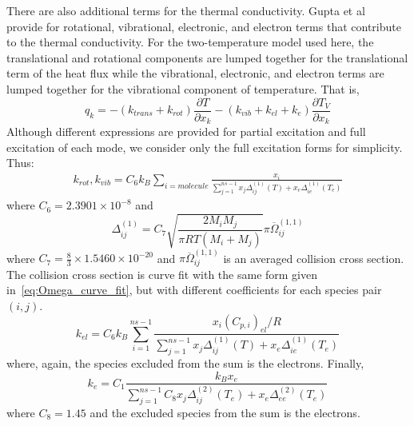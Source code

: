 There are also additional terms for the thermal conductivity. Gupta et al~\cite{GuptaYosetal1990} provide for rotational,
vibrational, electronic, and electron terms that contribute to the thermal conductivity. For the two-temperature model used
here, the translational and rotational components are lumped together for the translational term of the heat flux while the 
vibrational, electronic, and electron terms are lumped together for the vibrational component of temperature. That is,
%
\begin{equation}
q_k = -\left(k_{trans} + k_{rot}\right) \frac{\partial T}{\partial x_k} - \left( k_{vib} + k_{el} + k_e\right)\frac{\partial T_V}{\partial x_k}
\end{equation}
%
Although
different expressions are provided for partial excitation and full excitation of each mode, we consider only the full excitation
forms for simplicity. Thus:
%
\begin{equation}
\begin{split}
k_{rot}, k_{vib} = C_6 k_B \sum_{i=molecule} \frac{x_i}{\sum_{j=1}^{ns-1} x_j \Delta_{ij}^{(1)}(T) + x_e \Delta_{ie}^{(1)}(T_e)}
\end{split}
\end{equation}
%
where $C_6 = 2.3901\times 10^{-8}$ and 
%
\begin{equation}
\Delta_{ij}^{(1)} = C_7 \sqrt{\frac{2M_i M_j}{\pi R T\left(M_i + M_j \right)}} \pi \overline{\Omega}_{ij}^{(1,1)}
\end{equation}
%
where $C_7 = \frac{8}{3} \times 1.5460 \times 10^{-20}$ and $\pi \overline{\Omega}_{ij}^{(1,1)}$ is an averaged collision
cross section. The collision cross section is curve fit with the same form given in~\eqref{eq:Omega_curve_fit}, but with different
coefficients for each species pair $(i,j)$.
%
\begin{equation}
k_{el}  = C_6 k_B \sum_{i=1}^{ns-1} \frac{x_i (C_{p,i})_{el}/R}{\sum_{j=1}^{ns-1} x_j \Delta_{ij}^{(1)}(T) + 
x_e \Delta_{ie}^{(1)}(T_e)}
\end{equation}
%
where, again, the species excluded from the sum is the electrons.
Finally,
%
\begin{equation}
k_e = C_1 \frac{k_B x_e}{\sum_{j=1}^{ns-1} C_8 x_j \Delta_{ij}^{(2)}(T_e) + x_e\Delta_{ee}^{(2)}(T_e)}
\end{equation}
%
where $C_8 = 1.45$ and the excluded species from the sum is the electrons.


